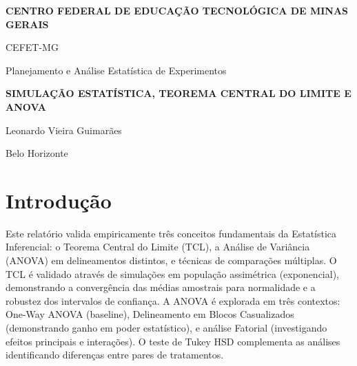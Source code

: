 \documentclass[12pt,a4paper,oneside]{article}
\begin{document}
\thispagestyle{empty}
\begin{center}

\vspace*{0.8cm}

{\large \textbf{CENTRO FEDERAL DE EDUCAÇÃO TECNOLÓGICA DE MINAS GERAIS}}

\vspace{0.2cm}

{\large CEFET-MG}

\vspace{1.5cm}

{\normalsize Planejamento e Análise Estatística de Experimentos}

\vspace{4cm}

{\huge \textbf{SIMULAÇÃO ESTATÍSTICA, TEOREMA CENTRAL DO LIMITE E ANOVA}}

\vspace{3cm}

{\normalsize Leonardo Vieira Guimarães}

\vspace*{\fill}

{\normalsize Belo Horizonte}

\vspace{0.2cm}

{\normalsize \the\year}

\end{center}

\newpage

\setcounter{page}{2}
\tableofcontents
\newpage

\pagestyle{fancy}
\section{Introdução}

Este relatório valida empiricamente três conceitos fundamentais da Estatística Inferencial: o Teorema Central do Limite (TCL), a Análise de Variância (ANOVA) em delineamentos distintos, e técnicas de comparações múltiplas. O TCL é validado através de simulações em população assimétrica (exponencial), demonstrando a convergência das médias amostrais para normalidade e a robustez dos intervalos de confiança. A ANOVA é explorada em três contextos: One-Way ANOVA (baseline), Delineamento em Blocos Casualizados (demonstrando ganho em poder estatístico), e análise Fatorial (investigando efeitos principais e interações). O teste de Tukey HSD complementa as análises identificando diferenças entre pares de tratamentos.
\end{document}
